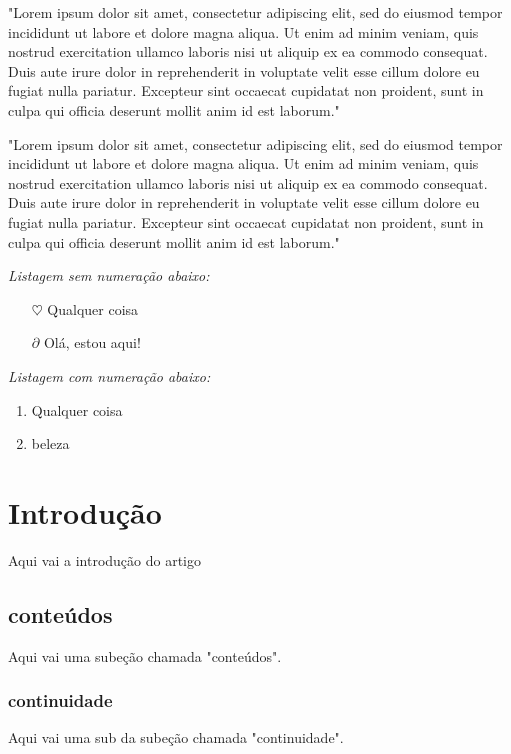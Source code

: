 \documentclass[12pt, a4paper]{article}
\begin{document}
"Lorem ipsum dolor sit amet, consectetur adipiscing elit, sed do eiusmod tempor incididunt ut labore et dolore magna aliqua. Ut enim ad minim veniam, quis nostrud exercitation ullamco laboris nisi ut aliquip ex ea commodo consequat. Duis aute irure dolor in reprehenderit in voluptate velit esse cillum dolore eu fugiat nulla pariatur. Excepteur sint occaecat cupidatat non proident, sunt in culpa qui officia deserunt mollit anim id est laborum."

"Lorem ipsum dolor sit amet, consectetur adipiscing elit, sed do eiusmod tempor incididunt ut labore et dolore magna aliqua. Ut enim ad minim veniam, quis nostrud exercitation ullamco laboris nisi ut aliquip ex ea commodo consequat. Duis aute irure dolor in reprehenderit in voluptate velit esse cillum dolore eu fugiat nulla pariatur. Excepteur sint occaecat cupidatat non proident, sunt in culpa qui officia deserunt mollit anim id est laborum."

\textit{Listagem sem numeração abaixo:}

\begin{itemize}
	\item[$\heartsuit$] Qualquer coisa
	\item[$\partial$] Olá, estou aqui!
\end{itemize}

\textit{Listagem com numeração abaixo:}

\begin{enumerate}
	\item Qualquer coisa
	\item beleza
\end{enumerate}

\section{Introdução}

Aqui vai a introdução do artigo

\subsection{conteúdos}

Aqui vai uma subeção chamada "conteúdos".

\subsubsection{continuidade}

Aqui vai uma sub da subeção chamada "continuidade".
\end{document}
